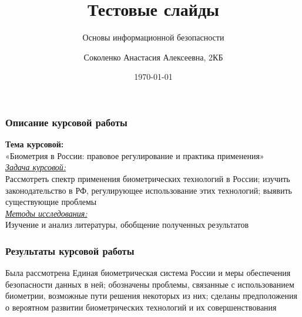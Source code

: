 \documentclass{beamer}
\title{Тестовые слайды}
\subtitle{Основы информационной безопасности}
\author{Соколенко Анастасия Алексеевна, 2КБ}
\date{\today}
\institute{БФУ им. И. Канта}
\begin{document}
	
	\begin{frame}
		\titlepage
	\end{frame}

	\begin{frame}
		\frametitle{Описание курсовой работы}
		\begin{center}
		 	\textbf{Тема курсовой:}\\
			«Биометрия в России: правовое регулирование и практика применения»\\
			\underline{\textit{Задача курсовой:}}\\
			Рассмотреть спектр применения биометрических технологий в России; изучить законодательство в РФ, регулирующее использование этих технологий; выявить существующие проблемы\\
			\underline{\textit{Методы исследования:}}\\
			Изучение и анализ литературы, обобщение полученных результатов
		\end{center}
	\end{frame}

	\begin{frame}
		\frametitle{Результаты курсовой работы}
		Была рассмотрена Единая биометрическая система России и меры обеспечения безопасности данных в ней; обозначены проблемы, связанные с использованием биометрии, возможные пути решения некоторых из них; сделаны предположения о вероятном развитии биометрических технологий и их совершенствования
	\end{frame}
\end{document}

